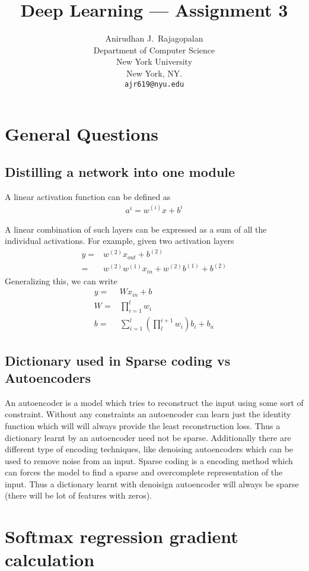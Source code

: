 \documentclass{article}
\title{Deep Learning --- Assignment 3}
\author{Anirudhan J.~Rajagopalan \\
  Department of Computer Science\\
  New York University\\
  New York, NY.\\
  \texttt{ajr619@nyu.edu} \\
}
\begin{document}
\maketitle

\section{General Questions}
\subsection{Distilling a network into one module}
A linear activation function can be defined as 
\begin{align*}
  a^{{i}} = w^{(i)}x + b^{i}
\end{align*}

A linear combination of such layers can be expressed as a sum of all the individual activations.  For example, given two activation layers
\begin{align*}
  y =& w^{(2)}x_{out} + b^{(2)}\\
  =& w^{(2)}w^{(1)}x_{in} + w^{(2)}b^{(1)} + b^{(2)}
\end{align*}
Generalizing this, we can write
\begin{align*}
  y =& Wx_{in} + b \\
  W =& \prod_{i = 1}^{l} w_{i} \\
  b =& \sum_{i = 1}^{l} (\prod_{l}^{i+1} w_{i})b_{i} + b_{n}
\end{align*}

\subsection{Dictionary used in Sparse coding vs Autoencoders}
An autoencoder is a model which tries to reconstruct the input using some sort of constraint.  Without any constraints an autoencoder can learn just the identity function which will will always provide the least reconstruction loss.  Thus a dictionary learnt by an autoencoder need not be sparse.  Additionally there are different type of encoding techniques, like denoising autoencoders which can be used to remove noise from an input.
Sparse coding is a encoding method which can forces the model to find a sparse and overcomplete representation of the input.  Thus a dictionary learnt with denoisign autoencoder will always be sparse (there will be lot of features with zeros).


\section{Softmax regression gradient calculation}
\end{document}
